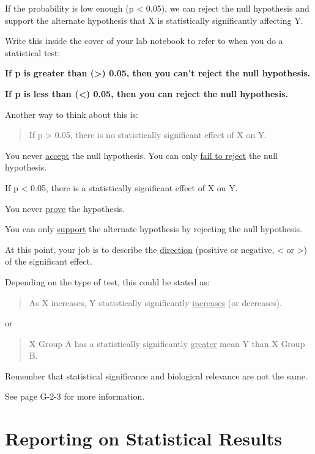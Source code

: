 \documentclass[twoside, 12pt]{article}
\begin{document}
If the probability is low enough (p \textless{} 0.05), we can reject the
null hypothesis and support the alternate hypothesis that X is
statistically significantly affecting Y.

Write this inside the cover of your lab notebook to refer to when you do
a statistical test:

\textbf{If p is greater than (\textgreater{}) 0.05, then you can't
reject the null hypothesis.}

\textbf{If p is less than (\textless{}) 0.05, then you can reject the
null hypothesis.}

Another way to think about this is:

\begin{quote}
If p \textgreater{} 0.05, there is no statistically significant effect
of X on Y.
\end{quote}

You never \underline{accept} the null hypothesis. You can only
\underline{fail to reject} the null hypothesis.

If p \textless{} 0.05, there is a statistically significant effect of X
on Y.

You never \underline{prove} the hypothesis.

You can only \underline{support} the alternate hypothesis by rejecting
the null hypothesis.

At this point, your job is to describe the \underline{direction}
(positive or negative, \textless{} or \textgreater{}) of the significant
effect.

Depending on the type of test, this could be stated as:

\begin{quote}
As X increases, Y statistically significantly \underline{increases} (or
decreases).
\end{quote}

or

\begin{quote}
X Group A has a statistically significantly \underline{greater} mean Y
than X Group B.
\end{quote}

Remember that statistical significance and biological relevance are not
the same.

See page G-2-3 for more information.

\section{Reporting on Statistical
Results}\label{reporting-on-statistical-results}
\end{document}
